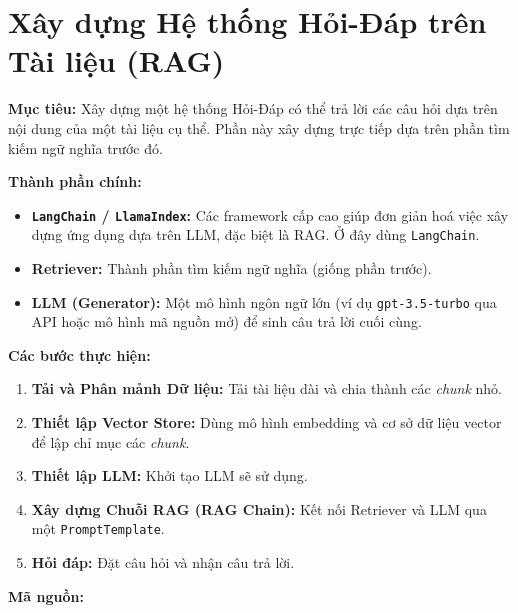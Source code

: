 
\section{Xây dựng Hệ thống Hỏi-Đáp trên Tài liệu (RAG)}
\label{sec:recipe_rag}

\textbf{Mục tiêu:} Xây dựng một hệ thống Hỏi-Đáp có thể trả lời các câu hỏi dựa trên nội dung của một tài liệu cụ thể. Phần này xây dựng trực tiếp dựa trên phần tìm kiếm ngữ nghĩa trước đó.

\textbf{Thành phần chính:}
\begin{itemize}
    \item \textbf{\texttt{LangChain} / \texttt{LlamaIndex}:} Các framework cấp cao giúp đơn giản hoá việc xây dựng ứng dụng dựa trên LLM, đặc biệt là RAG. Ở đây dùng \texttt{LangChain}.
    \item \textbf{Retriever:} Thành phần tìm kiếm ngữ nghĩa (giống phần trước).
    \item \textbf{LLM (Generator):} Một mô hình ngôn ngữ lớn (ví dụ \texttt{gpt-3.5-turbo} qua API hoặc mô hình mã nguồn mở) để sinh câu trả lời cuối cùng.
\end{itemize}

\textbf{Các bước thực hiện:}
\begin{enumerate}
    \item \textbf{Tải và Phân mảnh Dữ liệu:} Tải tài liệu dài và chia thành các \textit{chunk} nhỏ.
    \item \textbf{Thiết lập Vector Store:} Dùng mô hình embedding và cơ sở dữ liệu vector để lập chỉ mục các \textit{chunk}.
    \item \textbf{Thiết lập LLM:} Khởi tạo LLM sẽ sử dụng.
    \item \textbf{Xây dựng Chuỗi RAG (RAG Chain):} Kết nối Retriever và LLM qua một \texttt{PromptTemplate}.
    \item \textbf{Hỏi đáp:} Đặt câu hỏi và nhận câu trả lời.
\end{enumerate}

\textbf{Mã nguồn:}

